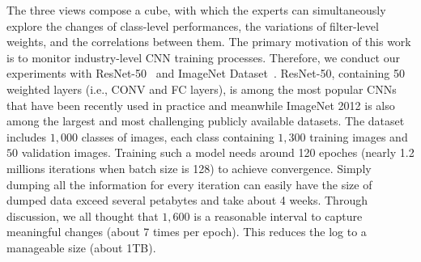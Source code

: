 \documentclass[format=acmsmall, review=false, screen=true]{acmart}
\newcommand{\ti}{\textcolor[rgb]{0,0,0}}
\newcommand{\dy}{\textcolor[rgb]{0,0,0}}
\begin{document}
\ti{
The three views compose a cube, with which the experts can simultaneously explore the changes of class-level performances, the variations of filter-level weights, and the correlations between them.
}%
The primary motivation of this work is to monitor industry-level CNN training processes. Therefore, we conduct our experiments with ResNet-50~\cite{he2016deep} and ImageNet Dataset~\cite{russakovsky2015imagenet}.
ResNet-50, containing 50 weighted layers (i.e., CONV and FC layers), is among the most popular CNNs that have been recently used in practice and meanwhile ImageNet 2012 is also among the largest and most challenging publicly available datasets.  
The dataset includes $1,000$ classes of images, each class containing $1,300$ training images and $50$ validation images.
Training such a model needs around 120 epoches (nearly 1.2 millions iterations when batch size is 128) to achieve convergence.
Simply dumping all the information for every iteration can easily have the size of dumped data exceed several petabytes and take about 4 weeks. Through discussion, we all thought that $1,600$ is a reasonable interval to capture meaningful changes (about 7 times per epoch). This reduces the log to a manageable size (about 1TB).
\end{document}
